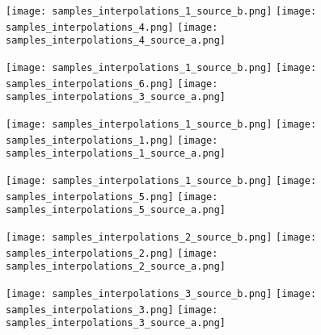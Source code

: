 \documentclass{article}
\begin{document}
\begin{figure*}[t]

\begin{subfigure}{0.98\textwidth}
  \centering
  \hfill
  \texttt{[image: samples\_interpolations\_1\_source\_b.png]}
  \hfill
  \texttt{[image: samples\_interpolations\_4.png]}
  \hfill
  \texttt{[image: samples\_interpolations\_4\_source\_a.png]}
  \hfill
\end{subfigure}

\begin{subfigure}{0.98\textwidth}
  \centering
  \hfill
  \texttt{[image: samples\_interpolations\_1\_source\_b.png]}
  \hfill
  \texttt{[image: samples\_interpolations\_6.png]}
  \hfill
  \texttt{[image: samples\_interpolations\_3\_source\_a.png]}
  \hfill
\end{subfigure}

\begin{subfigure}{0.98\textwidth}
  \centering
  \hfill
  \texttt{[image: samples\_interpolations\_1\_source\_b.png]}
  \hfill
  \texttt{[image: samples\_interpolations\_1.png]}
  \hfill
  \texttt{[image: samples\_interpolations\_1\_source\_a.png]}
  \hfill
\end{subfigure}

\begin{subfigure}{0.98\textwidth}
  \centering
  \hfill
  \texttt{[image: samples\_interpolations\_1\_source\_b.png]}
  \hfill
  \texttt{[image: samples\_interpolations\_5.png]}
  \hfill
  \texttt{[image: samples\_interpolations\_5\_source\_a.png]}
  \hfill
\end{subfigure}

\begin{subfigure}{0.98\textwidth}
  \centering
  \hfill
  \texttt{[image: samples\_interpolations\_2\_source\_b.png]}
  \hfill
  \texttt{[image: samples\_interpolations\_2.png]}
  \hfill
  \texttt{[image: samples\_interpolations\_2\_source\_a.png]}
  \hfill
\end{subfigure}

\begin{subfigure}{0.98\textwidth}
  \centering
  \hfill
  \texttt{[image: samples\_interpolations\_3\_source\_b.png]}
  \hfill
  \texttt{[image: samples\_interpolations\_3.png]}
  \hfill
  \texttt{[image: samples\_interpolations\_3\_source\_a.png]}
  \hfill
\end{subfigure}


\end{figure*}
\end{document}
